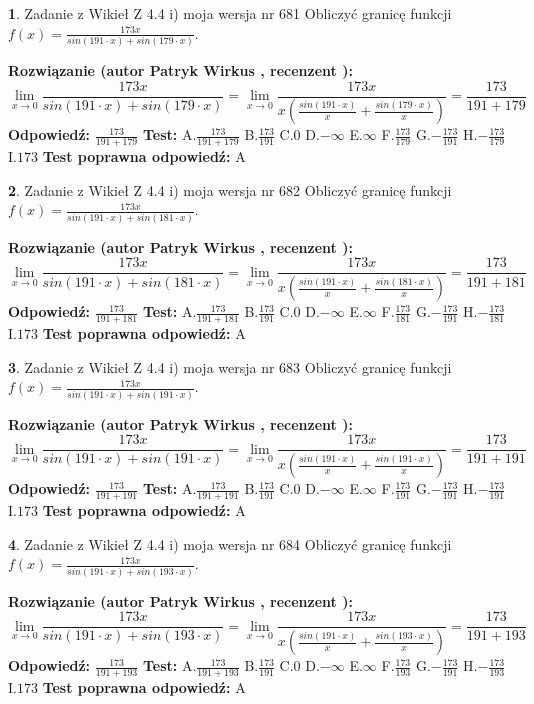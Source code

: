\documentclass[12pt, a4paper]{article}
\theoremstyle{definition} %
\newtheorem{zad}{}
\newcommand{\zadStart}[1]{\begin{zad}#1\newline}
\newcommand{\zadStop}{\end{zad}}
\newcommand{\rozwStart}[2]{\noindent \textbf{Rozwiązanie (autor #1 , recenzent #2): }\newline}
\newcommand{\rozwStop}{\newline}
\newcommand{\odpStart}{\noindent \textbf{Odpowiedź:}\newline}
\newcommand{\odpStop}{\newline}
\newcommand{\testStart}{\noindent \textbf{Test:}\newline}
\newcommand{\testStop}{\newline}
\newcommand{\kluczStart}{\noindent \textbf{Test poprawna odpowiedź:}\newline}
\newcommand{\kluczStop}{\newline}
\begin{document}
\zadStart{Zadanie z Wikieł Z 4.4 i) moja wersja nr 681}
Obliczyć granicę funkcji $f(x)=\frac{173x}{sin(191\cdot x) +sin(179\cdot x)}$.
\zadStop
\rozwStart{Patryk Wirkus}{}
$$\lim\limits_{x\to 0}\frac{173x}{sin(191\cdot x) +sin(179\cdot x)}=\lim\limits_{x\to 0}\frac{173x}{x(\frac{sin(191\cdot x)}{x}+\frac{sin(179\cdot x)}{x})}=\frac{173}{191+179}$$
\rozwStop
\odpStart
$\frac{173}{191+179}$
\odpStop
\testStart
A.$\frac{173}{191+179}$
B.$\frac{173}{191}$
C.$0$
D.$-\infty$
E.$\infty$
F.$\frac{173}{179}$
G.$-\frac{173}{191}$
H.$-\frac{173}{179}$
I.$173$
\testStop
\kluczStart
A
\kluczStop



\zadStart{Zadanie z Wikieł Z 4.4 i) moja wersja nr 682}
Obliczyć granicę funkcji $f(x)=\frac{173x}{sin(191\cdot x) +sin(181\cdot x)}$.
\zadStop
\rozwStart{Patryk Wirkus}{}
$$\lim\limits_{x\to 0}\frac{173x}{sin(191\cdot x) +sin(181\cdot x)}=\lim\limits_{x\to 0}\frac{173x}{x(\frac{sin(191\cdot x)}{x}+\frac{sin(181\cdot x)}{x})}=\frac{173}{191+181}$$
\rozwStop
\odpStart
$\frac{173}{191+181}$
\odpStop
\testStart
A.$\frac{173}{191+181}$
B.$\frac{173}{191}$
C.$0$
D.$-\infty$
E.$\infty$
F.$\frac{173}{181}$
G.$-\frac{173}{191}$
H.$-\frac{173}{181}$
I.$173$
\testStop
\kluczStart
A
\kluczStop



\zadStart{Zadanie z Wikieł Z 4.4 i) moja wersja nr 683}
Obliczyć granicę funkcji $f(x)=\frac{173x}{sin(191\cdot x) +sin(191\cdot x)}$.
\zadStop
\rozwStart{Patryk Wirkus}{}
$$\lim\limits_{x\to 0}\frac{173x}{sin(191\cdot x) +sin(191\cdot x)}=\lim\limits_{x\to 0}\frac{173x}{x(\frac{sin(191\cdot x)}{x}+\frac{sin(191\cdot x)}{x})}=\frac{173}{191+191}$$
\rozwStop
\odpStart
$\frac{173}{191+191}$
\odpStop
\testStart
A.$\frac{173}{191+191}$
B.$\frac{173}{191}$
C.$0$
D.$-\infty$
E.$\infty$
F.$\frac{173}{191}$
G.$-\frac{173}{191}$
H.$-\frac{173}{191}$
I.$173$
\testStop
\kluczStart
A
\kluczStop



\zadStart{Zadanie z Wikieł Z 4.4 i) moja wersja nr 684}
Obliczyć granicę funkcji $f(x)=\frac{173x}{sin(191\cdot x) +sin(193\cdot x)}$.
\zadStop
\rozwStart{Patryk Wirkus}{}
$$\lim\limits_{x\to 0}\frac{173x}{sin(191\cdot x) +sin(193\cdot x)}=\lim\limits_{x\to 0}\frac{173x}{x(\frac{sin(191\cdot x)}{x}+\frac{sin(193\cdot x)}{x})}=\frac{173}{191+193}$$
\rozwStop
\odpStart
$\frac{173}{191+193}$
\odpStop
\testStart
A.$\frac{173}{191+193}$
B.$\frac{173}{191}$
C.$0$
D.$-\infty$
E.$\infty$
F.$\frac{173}{193}$
G.$-\frac{173}{191}$
H.$-\frac{173}{193}$
I.$173$
\testStop
\kluczStart
A
\kluczStop
\end{document}
